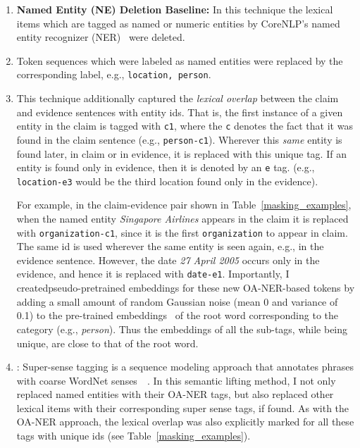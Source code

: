 \documentclass{article}
\begin{document}
\begin{enumerate}
\item \textbf{Named Entity (NE) Deletion Baseline:}
In this technique the lexical items which are tagged as named or numeric entities by CoreNLP's named entity recognizer (NER)~\citep*{manning2014stanford} were deleted.  

\item {}  Token sequences which were labeled as named entities were replaced by the corresponding label, e.g., \texttt{location, person}.

\item {} This technique additionally captured the \textit{lexical overlap} between the claim and evidence sentences with entity ids.  
That is, the first instance of a given entity in the claim is tagged with \texttt{c1}, where the \texttt{c} denotes the fact that it was found in the claim sentence (e.g., \texttt{person-c1}). Wherever this {\em same} entity is found later, in claim or in evidence, it is replaced with this unique tag. If an entity is found only in evidence, then it is denoted by an \texttt{e} tag. (e.g., \texttt{location-e3} would be the third location found only in the evidence).

For example, in the claim-evidence pair shown in Table~\ref{masking_examples}, when the named entity \textit{Singapore Airlines} appears in the claim it is replaced with \texttt{organization-c1}, since it is the first \texttt{organization} to appear in claim. 
The same id is used wherever the same entity is seen again, e.g., in the evidence sentence. However, the date \textit{27 April 2005} occurs only in the evidence, and hence it is replaced with \texttt{date-e1}.
Importantly, I createdpseudo-pretrained embeddings for these new OA-NER-based tokens by adding a small amount of random Gaussian noise (mean 0 and variance of 0.1) to the pre-trained embeddings~\citep*{pennington2014glove} of the root word corresponding to the category (e.g., \textit{person}). Thus the embeddings of all the sub-tags, while being unique, are close to that of the root word.
\item {}:
Super-sense tagging is a sequence modeling approach that annotates phrases with coarse WordNet senses~\citep*{ciaramita2003supersense}~\citep*{miller1990introduction}. In this semantic lifting method, I not only replaced named entities with their OA-NER tags, but also replaced other lexical items with their corresponding super sense tags, if found. As with the OA-NER approach, the lexical overlap was also explicitly marked for all these tags with unique ids (see Table~\ref{masking_examples}). 
\end{enumerate}
\end{document}
